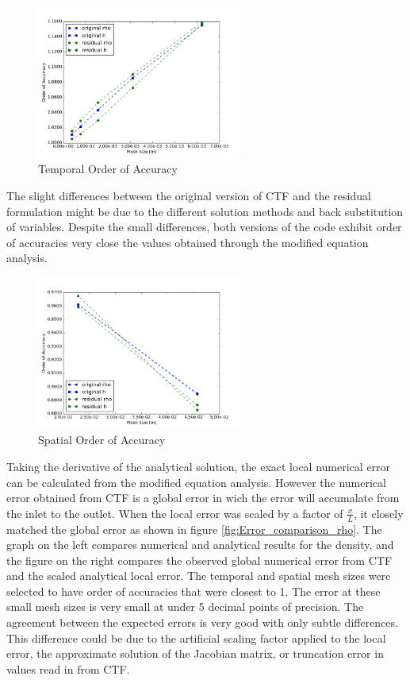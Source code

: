\begin{figure}[!h]
	\centering
	\includegraphics[width=0.60\textwidth]{images/Temporal_Study/Order_Of_Accuracy_Summary}
	\caption{Temporal Order of Accuracy}
	\label{fig:Temporal:OOA}
\end{figure}

The slight differences between the original version of CTF and the residual
formulation might be due to the different solution methods and back substitution
of variables. Despite the small differences, both versions of the code exhibit
order of accuracies very close the values obtained through the modified
equation analysis.

\begin{figure}[!h]
	\centering
	\includegraphics[width=0.60\textwidth]{images/Spatial_Study/Order_Of_Accuracy_Summary}
	\caption{Spatial Order of Accuracy}
	\label{fig:Spatial:OOA}
\end{figure}

Taking the derivative of the analytical solution, the exact local numerical
error can be calculated from the modified equation analysis. However the
numerical error obtained from CTF is a global error in wich the error will
accumalate from the inlet to the outlet. When the local error was scaled by a
factor of $\frac{x}{L}$, it closely matched the global error as shown in figure
\ref{fig:Error_comparison_rho}. The graph on the left compares numerical and
analytical results for the density, and the figure on the right compares the
observed global numerical error from CTF and the scaled analytical local error.
The temporal and spatial mesh sizes were selected to have order of accuracies
that were closest to 1. The error at these small mesh sizes is very small at
under 5 decimal points of precision. The agreement between the expected errors
is very good with only subtle differences. This difference could be due to the
artificial scaling factor applied to the local error, the approximate solution
of the Jacobian matrix, or truncation error in values read in from CTF.

